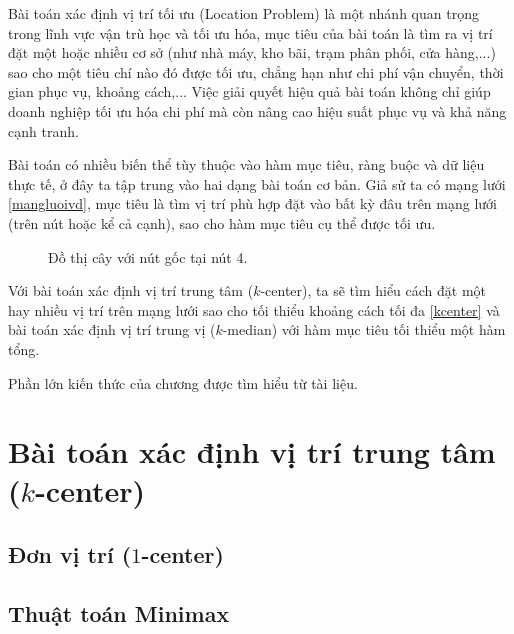 \documentclass[12pt,a4paper]{report}
\begin{document}
Bài toán xác định vị trí tối ưu (Location Problem) là một nhánh quan trọng trong lĩnh vực vận trù học và tối ưu hóa, mục tiêu của bài toán là tìm ra vị trí đặt một hoặc nhiều cơ sở (như nhà máy, kho bãi, trạm phân phối, cửa hàng,...) sao cho một tiêu chí nào đó được tối ưu, chẳng hạn như chi phí vận chuyển, thời gian phục vụ, khoảng cách,... Việc giải quyết hiệu quả bài toán không chỉ giúp doanh nghiệp tối ưu hóa chi phí mà còn nâng cao hiệu suất phục vụ và khả năng cạnh tranh.

Bài toán có nhiều biến thể tùy thuộc vào hàm mục tiêu, ràng buộc và dữ liệu thực tế, ở đây ta tập trung vào hai dạng bài toán cơ bản. Giả sử ta có mạng lưới \eqref{mangluoivd}, mục tiêu là tìm vị trí phù hợp đặt vào bất kỳ đâu trên mạng lưới (trên nút hoặc kể cả cạnh), sao cho hàm mục tiêu cụ thể được tối ưu.


\begin{figure}[h!]
    \centering
    \caption{\label{mangluoivd} Đồ thị cây với nút gốc tại nút 4.}
\end{figure}

Với bài toán xác định vị trí trung tâm ($k$-center), ta sẽ tìm hiểu cách đặt một hay nhiều vị trí trên mạng lưới sao cho tối thiểu khoảng cách tối đa \eqref{kcenter} và bài toán xác định vị trí trung vị ($k$-median) với hàm mục tiêu tối thiểu một hàm tổng.

Phần lớn kiến thức của chương được tìm hiểu từ tài liệu.

\section{Bài toán xác định vị trí trung tâm ($k$-center)} \label{kcenter}
\subsection{Đơn vị trí ($1$-center)}
\subsection*{Thuật toán Minimax}
\end{document}
